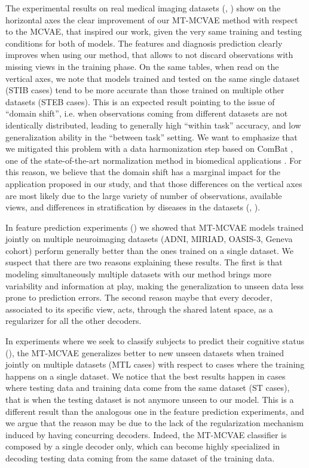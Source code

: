 	The experimental results on real medical imaging datasets (, ) show on the horizontal axes the clear improvement of our MT-MCVAE method with respect to the MCVAE, that inspired our work,
	given the very same training and testing conditions for both of models.
	The features and diagnosis prediction clearly improves when using our method, that allows to not discard observations with missing views in the training phase.
	On the same tables, when read on the vertical axes, we note that models trained and tested on the same single dataset (STIB cases) tend to be more accurate than those trained on multiple other datasets (STEB cases).
	This is an expected result pointing to the issue of ``domain shift'', i.e. when observations coming from different datasets are not identically distributed,
	leading to generally high ``within task'' accuracy, and low generalization ability in the ``between task'' setting.
	We want to emphasize that we mitigated this problem with a data harmonization step based on ComBat \citep{combat},
	one of the state-of-the-art normalization method in biomedical applications \citep{Fortin2017, Fortin2018, Orlhac2020}.
	For this reason, we believe that the domain shift has a marginal impact for the application proposed in our study,
	and that those differences on the vertical axes are most likely due to the large variety of number of observations, available views, and differences in stratification by diseases in the datasets (\cf {}, ).

In feature prediction experiments () we showed that MT-MCVAE models trained jointly on multiple neuroimaging datasets (ADNI, MIRIAD, OASIS-3, Geneva cohort)
perform generally better than the ones trained on a single dataset.
We suspect that there are two reasons explaining these results.
The first is that modeling simultaneously multiple datasets with our method brings more variability and information at play, making the generalization to unseen data less prone to prediction errors.
The second reason maybe that every decoder, associated to its specific view, acts, through the shared latent space, as a regularizer for all the other decoders.

In experiments where we seek to classify subjects to predict their cognitive status (),
the MT-MCVAE generalizes better to new unseen datasets when trained jointly on multiple datasets (MTL cases) with respect to cases where the training happens on a single dataset.
We notice that the best results happen in cases where testing data and training data come from the same dataset (ST cases), that is when the testing dataset is not anymore unseen to our model.
This is a different result than the analogous one in the feature prediction experiments, and we argue that the reason may be due to the lack of the regularization mechanism induced by having concurring decoders.
Indeed, the MT-MCVAE classifier is composed by a single decoder only, which can become highly specialized in decoding testing data coming from the same dataset of the training data.

